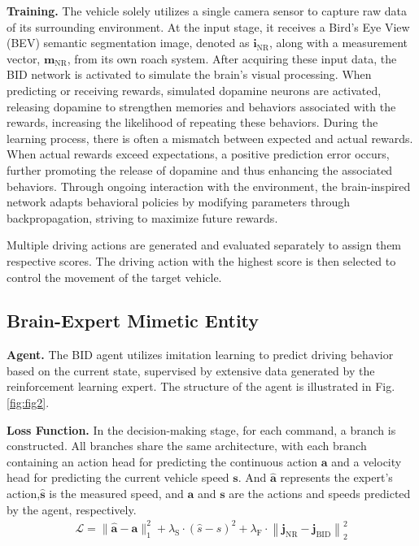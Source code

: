 \textbf{\textsf{Training.}} The vehicle solely utilizes a single camera sensor to capture raw data of its surrounding environment. At the input stage, it receives a Bird's Eye View (BEV) semantic segmentation image, denoted as $\mathbf{i}_{\mathrm{NR}}$, along with a measurement vector, $\mathbf{m}_{\mathrm{NR}}$, from its own roach system. After acquiring these input data, the BID network is activated to simulate the brain's visual processing. When predicting or receiving rewards, simulated dopamine neurons are activated, releasing dopamine to strengthen memories and behaviors associated with the rewards, increasing the likelihood of repeating these behaviors. During the learning process, there is often a mismatch between expected and actual rewards. When actual rewards exceed expectations, a positive prediction error occurs, further promoting the release of dopamine and thus enhancing the associated behaviors. Through ongoing interaction with the environment, the brain-inspired network adapts behavioral policies by modifying parameters through backpropagation, striving to maximize future rewards.

Multiple driving actions are generated and evaluated separately to assign them respective scores. The driving action with the highest score is then selected to control the movement of the target vehicle.
\subsection{Brain-Expert Mimetic Entity}
\hspace{1pc}\textbf{\textsf{Agent.}} The BID agent utilizes imitation learning to predict driving behavior based on the current state, supervised by extensive data generated by the reinforcement learning expert. The structure of the agent is illustrated in Fig. \ref{fig:fig2}.

\textbf{\textsf{Loss Function.}} In the decision-making stage, for each command, a branch is constructed. All branches share the same architecture, with each branch containing an action head for predicting the continuous action $\mathbf{a}$ and a velocity head for predicting the current vehicle speed $\mathbf{s}$. And $\mathbf{\hat{a}}$ represents the expert's action,$\mathbf{\hat{s}}$ is the measured speed, and $\mathbf{a}$ and $\mathbf{s}$ are the actions and speeds predicted by the agent, respectively. 
\begin{align}
   \mathcal{L} = \|\hat{\mathbf{a}}-\mathbf{a}\|_{1}^{2} + \lambda_{\mathrm{S}} \cdot (\hat{s}-s)^{2} + \lambda_{\mathrm{F}} \cdot \left\| \mathbf{j}_{\mathrm{NR}}-\mathbf{j}_{\mathrm{BID}} \right\|_{2}^{2}
\end{align}

